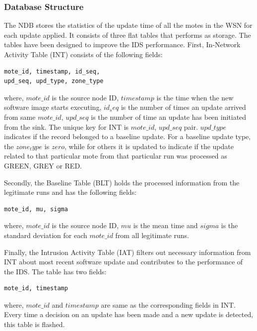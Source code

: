 \documentclass[conference,final]{IEEEtran}
\begin{document}
\subsubsection{Database Structure}
\label{ssc:db}
The NDB stores the statistics of the update time of all the motes in the WSN for each update applied.
It consists of three flat tables that performs as storage.
The tables have been  designed to improve the IDS performance. 
First, In-Network Activity Table (INT) consists of the  following fields:
\begin{verbatim}
mote_id, timestamp, id_seq, 
upd_seq, upd_type, zone_type
\end{verbatim}
where, $mote\_id$ is the source node ID, $timestamp$ is the time when the new software image starts executing, $id_seq$ is the number of times an update arrived from same $mote\_id$, $upd\_seq$ is the number of time an update has been initiated from the sink.
The unique key for INT is $mote\_id$, $upd\_seq$ pair.
$upd\_type$ indicates if the record belonged to a baseline update.
For a baseline update type, the $zone_type$ is $zero$, while for others it is updated to indicate if the update related to that particular mote from that particular run was processed as GREEN, GREY or RED.

Secondly, the Baseline Table (BLT) holds the processed information from the legitimate runs and has the following fields:
\begin{verbatim}
mote_id, mu, sigma
\end{verbatim}
where, $mote\_id$ is the source node ID, $mu$ is the mean time and $sigma$ is the standard deviation for each $mote\_id$ from all legitimate runs.

Finally, the Intrusion Activity Table (IAT) filters out necessary information from INT about most recent software update and contributes to the performance of the IDS.
The table has two fields:
\begin{verbatim}
mote_id, timestamp
\end{verbatim}
where, $mote\_id$  and $timestamp$ are same as the corresponding fields in INT.
Every time a decision on an update has been made and a new update is detected, this table is flashed.
\end{document}
